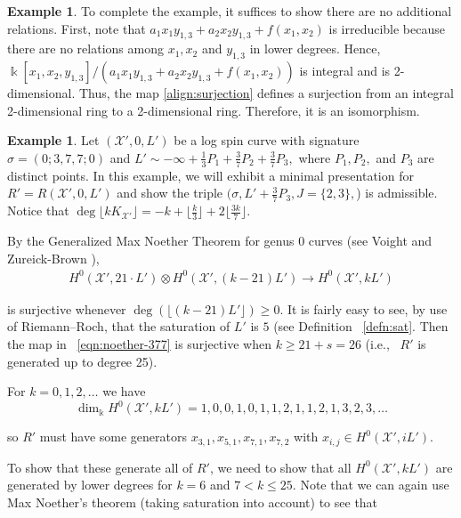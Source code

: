 \documentclass{amsart}
\theoremstyle{plain}
\theoremstyle{definition}
\newtheorem{example}[thm]{Example}
\theoremstyle{remark}
\numberwithin{equation}{section}
\newcommand\Bk{{\Bbbk}}
\newcommand\sx{\mathscr X}
\newcommand{\halfcan}{L}
\begin{document}
\begin{example}
To complete the example, it suffices to show there are no
additional relations. First, note that $a_1 x_1 y_{1, 3} + a_2 x_2
y_{1, 3} + f(x_1, x_2)$ is irreducible because there are no
relations among $x_1, x_2$ and $y_{1, 3}$ in lower degrees. Hence,
$\Bk[x_1, x_2, y_{1, 3}] / (a_1 x_1 y_{1, 3} + a_2 x_2 y_{1, 3} +
f(x_1, x_2))$ is integral and is 2-dimensional. Thus, the map
\eqref{align:surjection} defines a surjection from an integral
2-dimensional ring to a 2-dimensional ring. Therefore, it is an 
isomorphism.
\end{example}


\begin{example}
\label{eg:base-0-377}
Let $(\sx', 0, \halfcan')$ be a log spin curve with signature $\sigma =
(0; 3, 7, 7; 0)$ and $\halfcan' \sim -\infty + \frac{1}{3} P_1 +
\frac{3}{7} P_2 + \frac{3}{7} P_3,$ where $P_1, P_2,$ and $P_3$ are
distinct points. In this example, we will exhibit a minimal
presentation for $R' = R(\sx', 0, \halfcan')$ and show the triple
$(\sigma, \halfcan' + \frac{3}{7} P_3, J = \{2, 3\},$) is admissible.
Notice that $\deg \lfloor k K_{\sx'} \rfloor= -k + \lfloor \frac{k}{3}
\rfloor + 2 \lfloor \frac{3k}{7} \rfloor$.

By the Generalized Max Noether Theorem for genus 0 curves (see Voight
and Zureick-Brown \cite[Lemma 3.1.1]{vzb:stacky}),
\begin{align}
\label{eqn:noether-377}
	H^0 (\sx', 21 \cdot \halfcan') \otimes H^0 (\sx',
	(k - 21) \halfcan') \rightarrow H^0 (\sx',
	k \halfcan')
\end{align}

\noindent
is surjective whenever $\deg (\lfloor (k - 21) \halfcan' \rfloor)
\geq 0$. It is fairly easy to see, by use of Riemann--Roch, that
the saturation of $\halfcan'$ is $5$ (see Definition ~\ref{defn:sat}.
Then the map in ~\eqref{eqn:noether-377} is surjective when $k \geq
21 + s = 26$ (i.e.,~ $R'$ is generated up to degree 25).

For $k = 0, 1, 2, \ldots$ we have
\[
	\dim_\Bk H^0 (\sx', k \halfcan') = 1, 0, 0, 1, 0, 1, 1, 2, 1, 1, 2, 1, 3, 2, 3, \ldots
\]

\noindent
so $R'$ must have some generators $x_{3, 1}, x_{5, 1}, x_{7, 1},
x_{7, 2}$ with $x_{i, j} \in H^0(\sx', i \halfcan')$.

To show that these generate all of $R'$, we need to show that all
$H^0 (\sx', k \halfcan')$ are generated by lower degrees for $k = 6$
and $7 < k \leq 25$. Note that we can again use Max Noether's theorem
(taking saturation into account) to see that


\end{example}
\end{document}

